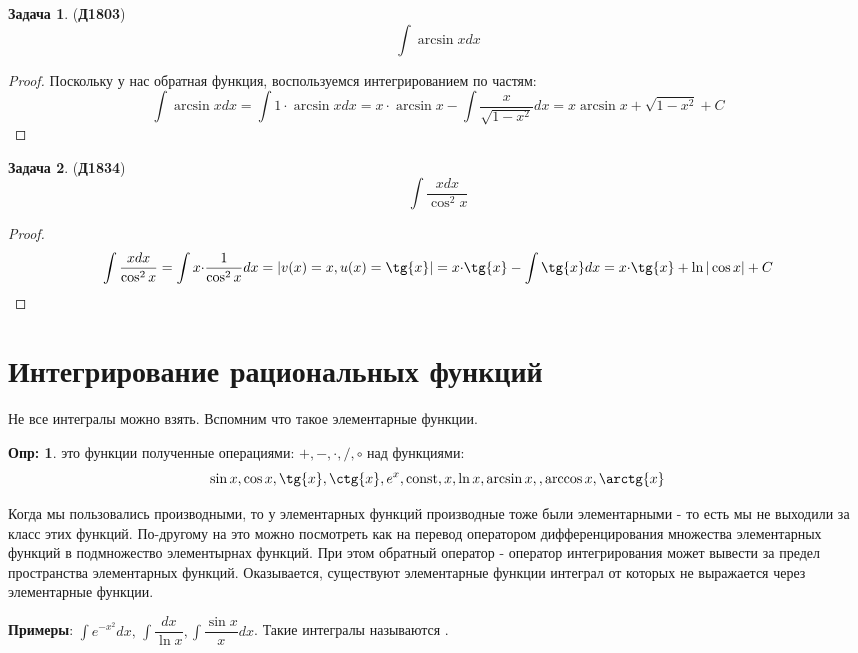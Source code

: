 \documentclass[12pt]{article}
\theoremstyle{definition}
\newtheorem{defn}{Опр:}
\newtheorem{problem}{Задача}
\DeclareMathOperator{\const}{\text{const}}
\DeclareMathOperator{\dint}{\displaystyle\int}
\begin{document}
\begin{problem}(\textbf{Д1803})
	$$
		\dint \arcsin{x}dx
	$$
\end{problem}
\begin{proof}
	Поскольку у нас обратная функция, воспользуемся интегрированием по частям:
	$$
		\dint \arcsin{x}dx = \dint 1{\cdot}\arcsin{x}dx = x{\cdot}\arcsin{x} - \dint \dfrac{x}{\sqrt{1-x^2}}dx = x\arcsin{x} + \sqrt{1 - x^2} + C
	$$
\end{proof}

\begin{problem}(\textbf{Д1834})
	$$
		\dint \dfrac{x dx}{\cos^2{x}}
	$$
\end{problem}
\begin{proof}
	$$
		\dint \dfrac{x dx}{\cos^2{x}} = \dint x{\cdot}\dfrac{1}{\cos^2{x}}dx = |v(x) = x, u(x) =\tg{x}| = x{\cdot}\tg{x} - \dint\tg{x}dx = x{\cdot}\tg{x}  + \ln{|\cos{x}|} + C
	$$
\end{proof}
\newpage
\section*{Интегрирование рациональных функций}

Не все интегралы можно взять. Вспомним что такое элементарные функции.
\begin{defn}
	 это функции полученные операциями: $+, -, \cdot, /, \circ$ над функциями:
	$$
		\sin{x}, \cos{x}, \tg{x}, \ctg{x}, e^{x}, \const, x, \ln{x}, \arcsin{x}, , \arccos{x},\arctg{x}
	$$
\end{defn}
Когда мы пользовались производными, то у элементарных функций производные тоже были элементарными - то есть мы не выходили за класс этих функций. По-другому на это можно посмотреть как на перевод оператором дифференцирования множества элементарных функций в подмножество элементырнах функций. При этом обратный оператор - оператор интегрирования может вывести за предел пространства элементарных функций. Оказывается, существуют элементарные функции интеграл от которых не выражается через элементарные функции.

\textbf{Примеры}: $\dint e^{-x^2}dx, \, \dint \dfrac{dx}{\ln{x}}, \dint \dfrac{\sin{x}}{x}dx$. Такие интегралы называются .
\end{document}
